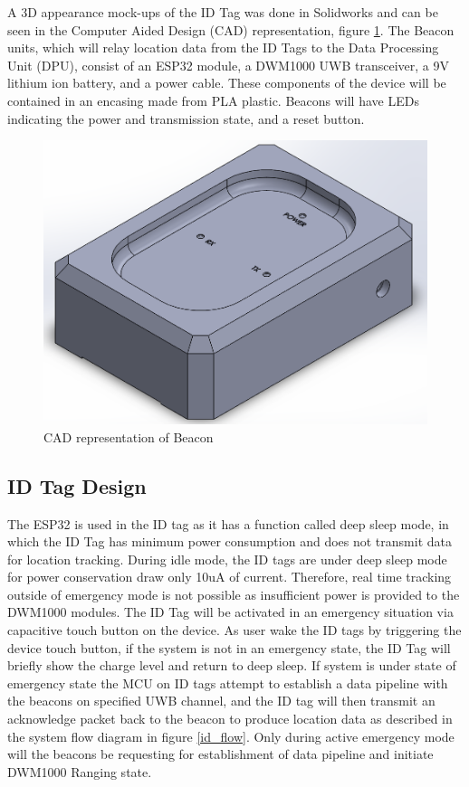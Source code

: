 \pagebreak
A 3D appearance mock-ups of the ID Tag was done in Solidworks and can be seen in the Computer Aided Design (CAD) representation, figure \ref{Bcn_CAD}. The Beacon units, which will relay location data from the ID Tags to the Data Processing Unit (DPU), consist of an ESP32 module, a DWM1000 UWB transceiver, a 9V lithium ion battery, and a power cable. These components of the device will be contained in an encasing made from PLA plastic. Beacons will have LEDs indicating the power and transmission state, and a reset button. 

\bigskip
\begin{figure}[H]
\centering
    \includegraphics[width=\linewidth]{./images/Beacon.png}
    \caption{CAD representation of Beacon}
    \label{Bcn_CAD}
\end{figure}



\pagebreak
\subsection{ID Tag Design}
The ESP32 is used in the ID tag as it has a function called deep sleep mode, in which the ID Tag has minimum power consumption and does not transmit data for location tracking. During idle mode, the ID tags are under deep sleep mode for power conservation draw only 10uA of current. Therefore, real time tracking outside of emergency mode is not possible as insufficient power is provided to the DWM1000 modules. The ID Tag will be activated in an emergency situation via capacitive touch button on the device. As user wake the ID tags by triggering the device touch button, if the system is not in an emergency state, the ID Tag will briefly show the charge level and return to deep sleep. If system is under state of emergency state the MCU on ID tags attempt to establish a data pipeline with the beacons on specified UWB channel, and the ID tag will then transmit an acknowledge packet back to the beacon to produce location data as described in the system flow diagram in figure \ref{id_flow}. Only during active emergency mode will the beacons be requesting for establishment of data pipeline and initiate DWM1000 Ranging state.

